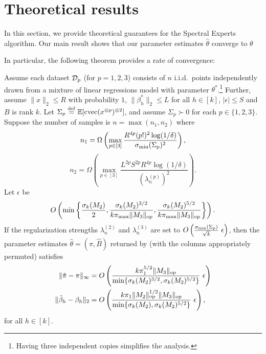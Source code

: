 \section{Theoretical results}
\label{sec:theory}

In this section, we provide theoretical guarantees for the Spectral Experts algorithm.
Our main result shows that our parameter estimates $\hat\theta$ converge to $\theta$


In particular, the following theorem provides a rate of convergence:

\begin{theorem}
\label{thm:convergence}
Assume each dataset $\mathcal{D}_p$ (for $p = 1, 2, 3$) consists of $n$ i.i.d.\ points independently drawn from a mixture
of linear regressions model with parameter $\theta^*$.\footnote{Having three independent copies simplifies the analysis.}
Further, assume 
$\|x\|_2 \le R$ with probability $1$, 
$\|\beta_h^*\|_2 \le L$ for all $h \in [k]$,
$|\epsilon| \le S$
and $B$ is rank $k$.
Let $\Sigma_p \stackrel{\rm def}{=} \operatorname{\mathbb{E}}[\operatorname{cvec}(x^{\otimes p})^{\otimes 2}]$, 
and assume $\Sigma_p \succ 0$ for each $p \in \{1,2,3\}$.
Suppose the number of samples is
$n = \max(n_1,n_2)$
where 
$$n_1 = \Omega \left(\max_{p \in [3]} \frac{R^{4p} (p!)^2 \log(1/\delta)}{\sigma_\text{\rm min}(\Sigma_p)^2} \right),$$
$$n_2 = \Omega \left(\max_{p\in [3]} \frac{L^{2p} S^{2p} R^{4p} \log(1/\delta)}{\left(\lambda_n^{(p)}\right)^2} \right).$$
Let $\epsilon$ be 
$$O\left( \min\left\{ 
    \frac{\sigma_k(M_2)}{2}, 
    \frac{\sigma_k(M_2)^{3/2}}{k \pi_{\max} \|M_3\|_{\text{\rm op}}},
    \frac{\sigma_k(M_2)^{5/2}}{k \pi_{\max} \|M_3\|_{\text{\rm op}}} 
    \right\}\right).$$ 
If the regularization strengths $\lambda_n^{(2)}$ and $\lambda_n^{(3)}$ are
set to $O\left(\frac{\sigma_\text{\rm min}(\Sigma_p)}{\sqrt{k}}~ \epsilon \right)$, 
then the parameter estimates $\hat\theta = (\hat\pi, \hat B)$ returned by
 (with the columns appropriately permuted)
satisfies 
  \begin{align*}
  \|\hat \pi - \pi \|_{\infty}
  &= O\left(\frac{k \pi_1^{5/2}\| {M_3} \|_{\text{\rm op}}}{\min\{ \sigma_k(M_2)^{3/2}, \sigma_k(M_2)^{5/2} \}} ~ \epsilon \right) \\
  \|\hat \beta_h - \beta_h\|_2
  &= O\left( \frac{k \pi_1 \|M_2\|_{\text{\rm op}}^{1/2} \| {M_3} \|_{\text{\rm op}}}{\min\{ \sigma_k(M_2), \sigma_k(M_2)^{5/2} \}}~ \epsilon \right),
  \end{align*}
  for all $h \in [k]$.
\end{theorem}

